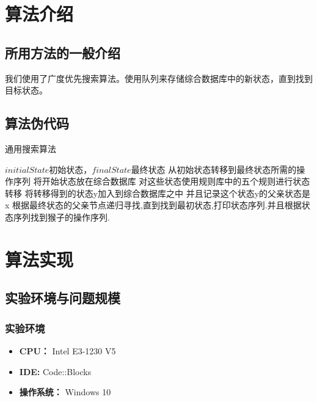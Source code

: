 \documentclass[forprint]{WHUBachelor}
\begin{document}
\chapter{算法介绍}

\section{所用方法的一般介绍}

我们使用了广度优先搜索算法。使用队列来存储综合数据库中的新状态，直到找到目标状态。

\section{算法伪代码}


\renewcommand{\algorithmicrequire}{\textbf{输入:}}
\renewcommand{\algorithmicensure}{\textbf{输出:}}
\begin{algorithm}[H]
  \caption{通用搜索算法}
  \begin{algorithmic}[1] %
    \Require $initialState$初始状态，$finalState$最终状态
    \Ensure 从初始状态转移到最终状态所需的操作序列
    \State 将开始状态放在综合数据库
    \State 对这些状态使用规则库中的五个规则进行状态转移
    \State 将转移得到的状态y加入到综合数据库之中
    \State 并且记录这个状态y的父亲状态是x
    \EndFor
    \EndWhile
    \State 根据最终状态的父亲节点递归寻找,直到找到最初状态,打印状态序列.并且根据状态序列找到猴子的操作序列.
  \end{algorithmic}
\end{algorithm}

\chapter{算法实现}


\section{实验环境与问题规模}

\subsection{实验环境}

\begin{itemize}
\item \textbf{CPU：} Intel E3-1230 V5
\item \textbf{IDE:} Code::Blocks
\item \textbf{操作系统：} Windows 10
\end{itemize}
\end{document}
